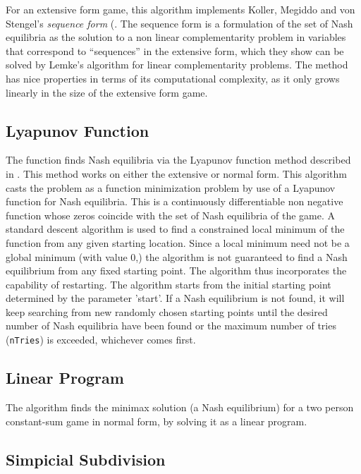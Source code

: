 For an extensive form game, this algorithm implements Koller, Megiddo
and von Stengel's {\em sequence form} (\cite{KolMegSte:94}. The
sequence form is a formulation of the set of Nash equilibria as the
solution to a non linear complementarity problem in variables that
correspond to ``sequences'' in the extensive form, which they show can
be solved by Lemke's algorithm for linear complementarity problems.
The method has nice properties in terms of its computational
complexity, as it only grows linearly in the size of the extensive
form game.  

\subsection{Lyapunov Function}

The  function finds Nash equilibria via the Lyapunov
function method described in \cite{McK:91}.  This method works on
either the extensive or normal form.  This algorithm casts the problem
as a function minimization problem by use of a Lyapunov function for
Nash equilibria.  This is a continuously differentiable non negative
function whose zeros coincide with the set of Nash equilibria of the
game.  A standard descent algorithm is used to find a constrained
local minimum of the function from any given starting location.  Since
a local minimum need not be a global minimum (with value 0,) the
algorithm is not guaranteed to find a Nash equilibrium from any fixed
starting point.  The algorithm thus incorporates the capability of
restarting.  The algorithm starts from the initial starting point
determined by the parameter 'start'.  If a Nash equilibrium is not
found, it will keep searching from new randomly chosen starting points
until the desired number of Nash equilibria have been found or the
maximum number of tries (\verb+nTries+) is exceeded, whichever
comes first.

\subsection{Linear Program}

The  algorithm finds the minimax solution (a Nash
equilibrium) for a two person constant-sum game in normal form, by
solving it as a linear program.

\subsection{Simpicial Subdivision}

